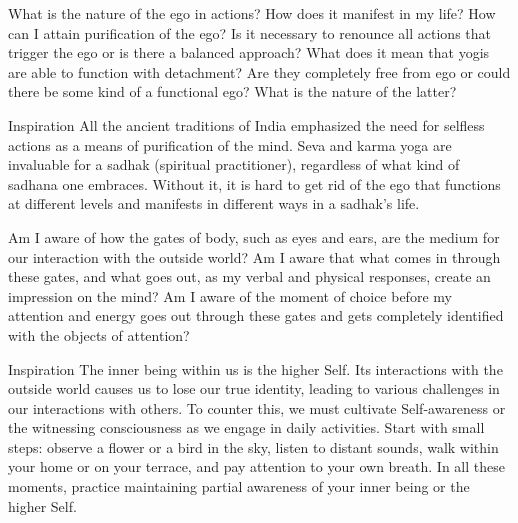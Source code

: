 \newpage
\begin{mananam}{} 
\mananamtext What is the nature of the ego in actions? How does it manifest in my life? How can I attain purification of the ego? Is it necessary to renounce all actions that trigger the ego or is there a balanced approach? What does it mean that yogis are able to function with detachment? Are they completely free from ego or could there be some kind of a functional ego? What is the nature of the latter? 
\end{mananam}
\WritingHand{}
\begin{inspiration}{\mananamfont Inspiration}
\mananamtext All the ancient traditions of India emphasized the need for selfless actions as a means of purification of the mind. Seva and karma yoga are invaluable for a sadhak (spiritual practitioner), regardless of what kind of sadhana one embraces. Without it, it is hard to get rid of the ego that functions at different levels and manifests in different ways in a sadhak’s life.
\end{inspiration}
\newpage



\newpage
\begin{mananam}{} 
\mananamtext Am I aware of how the gates of body, such as eyes and ears, are the medium for our interaction with the outside world? Am I aware that what comes in through these gates, and what goes out, as my verbal and physical responses, create an impression on the mind? Am I aware of the moment of choice before my attention and energy goes out through these gates and gets completely identified with the objects of attention?
\end{mananam}
\WritingHand{}
\begin{inspiration}{\mananamfont Inspiration}
\mananamtext The inner being within us is the higher Self. Its interactions with the outside world causes us to lose our true identity, leading to various challenges in our interactions with others. To counter this, we must cultivate Self-awareness or the witnessing consciousness as we engage in daily activities. Start with small steps: observe a flower or a bird in the sky, listen to distant sounds, walk within your home or on your terrace, and pay attention to your own breath. In all these moments, practice maintaining partial awareness of your inner being or the higher Self.
\end{inspiration}
\newpage


